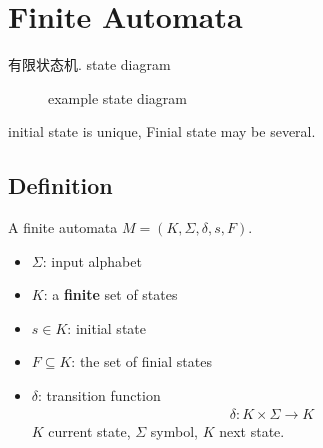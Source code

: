\newpage
\section{Finite Automata}
有限状态机. state diagram

\begin{figure}[!htb]
    \centering
    \caption{example state diagram}
\end{figure}

initial state is unique, Finial state may be several. 

\subsection{Definition}

\begin{definition}
    A finite automata $M=(K, \Sigma, \delta, s, F)$. 
    \begin{itemize}
        \item $\Sigma$: input alphabet
        \item $K$: a \textbf{finite} set of states
        \item $s\in K$: initial state
        \item $F\subseteq K$: the set of finial states
        \item $\delta$: transition function
        \begin{align*}
            \delta: K \times \Sigma \rightarrow K
        \end{align*}
        $K$ current state, $\Sigma$ symbol, $K$ next state. 
    \end{itemize}
\end{definition}


